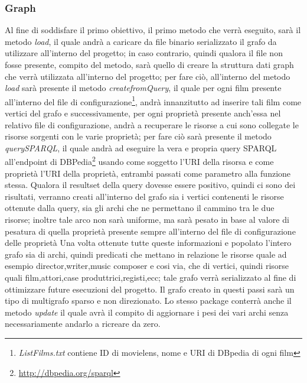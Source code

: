 \subsubsection{Graph}
Al fine di soddisfare il primo obiettivo, il primo metodo che verrà eseguito, sarà il metodo \emph{load}, il quale andrà a caricare da file binario serializzato il grafo da utilizzare all'interno del progetto; in caso contrario, quindi qualora il file non fosse presente, compito del metodo, sarà quello di creare la struttura dati graph che verrà utilizzata all'interno del progetto; per fare ciò, all'interno del metodo \emph{load} sarà presente il metodo \emph{createfromQuery}, il quale per ogni film presente all'interno del file di configurazione\footnote{\emph{ListFilms.txt} contiene ID di movielens, nome e URI di DBpedia di ogni film}, andrà innanzitutto ad inserire tali film come vertici del grafo e successivamente, per ogni proprietà presente anch'essa nel relativo file di configurazione, andrà a recuperare le risorse a cui sono collegate le risorse sorgenti con le varie proprietà; per fare ciò sarà presente il metodo \emph{querySPARQL}, il quale andrà ad eseguire la vera e propria query SPARQL all'endpoint di DBPedia\footnote{\url{http://dbpedia.org/sparql}} usando come soggetto l'URI della risorsa e come proprietà l'URI della proprietà, entrambi passati come parametro alla funzione stessa. Qualora il resultset della query dovesse essere positivo, quindi ci sono dei risultati, verranno creati all'interno del grafo sia i vertici contenenti le risorse ottenute dalla query, sia gli archi che ne permettano il cammino tra le due risorse; inoltre tale arco non sarà uniforme, ma sarà pesato in base al valore di pesatura di quella proprietà presente sempre all'interno del file di configurazione delle proprietà 
Una volta ottenute tutte queste informazioni e popolato l'intero grafo sia di archi, quindi predicati che mettano in relazione le risorse quale ad esempio director,writer,music composer e cosi via, che di vertici, quindi risorse quali film,attori,case produttrici,registi,ecc; tale grafo verrà serializzato al fine di ottimizzare future esecuzioni del progetto. Il grafo creato in questi passi sarà un tipo di multigrafo sparso e non direzionato.
Lo stesso package conterrà anche il metodo \emph{update} il quale avrà il compito di aggiornare i pesi dei vari archi senza necessariamente andarlo a ricreare da zero.

